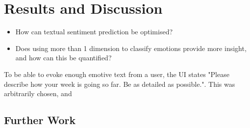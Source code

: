 \section{Results and Discussion}
\begin{itemize}
    \item How can textual sentiment prediction be optimised?
    \item Does using more than 1 dimension to classify emotions provide more insight, and how can this be quantified?
\end{itemize}


To be able to evoke enough emotive text from a user, the UI states "Please describe how your week is going so far. Be as detailed as possible.". This was arbitrarily chosen, and 

\subsection{Further Work}